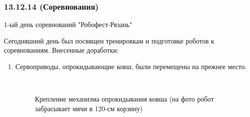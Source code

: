 \subsubsection{13.12.14 (Соревнования)}
\begin{center}
	1-ый день соревнований "Робофест-Рязань"
\end{center}
Сегодняшний день был посвящен тренировкам и подготовке роботов к соревнованиям. \newline
Внесенные доработки:
\begin{enumerate}
	\item Сервоприводы, опрокидывающие ковш, были перемещены на прежнее место. 
	\begin{figure}[H]
		\begin{minipage}[h]{0.2\linewidth}
			\center  
		\end{minipage}
		\begin{minipage}[h]{0.6\linewidth}
			\caption{Крепление механизма опрокидывания ковша (на фото робот забрасывает мячи в 120-см корзину)}
		\end{minipage}
	\end{figure}
	

\end{enumerate}
